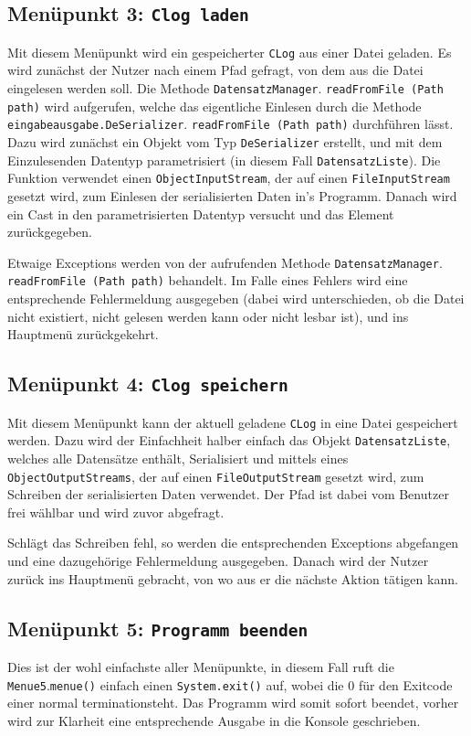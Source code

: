 \documentclass[oneside,12pt]{scrartcl}
\newcommand*{\EnableHyphenationInTexttt}{\hyphenchar\font=45\relax}%
\newcommand{\code}[1]{\textcolor{Firebrick4}{\bcode{#1}}}
\newcommand{\class}[1]{\textcolor{Green4}{\bcode{#1}}}
\newcommand{\method}[1]{\textcolor{Orange3}{\bcode{#1()}}}
\newcommand{\function}[2]{\textcolor{Orange3}{\bcode{#1 (\attribute{#2})}}}
\newcommand{\attribute}[1]{\textcolor{SkyBlue3}{\bcode{#1}}}
\newcommand{\methodcall}[2]{\class{#1}.\method{#2}}
\newcommand{\functioncall}[3]{\class{#1}. \function{#2}{#3}}
\newcommand{\bcode}[1]{\texttt{\EnableHyphenationInTexttt#1}}
\begin{document}
\subsection{Menüpunkt 3: \code{Clog laden}}
Mit diesem Menüpunkt wird ein gespeicherter \code{CLog} aus einer Datei geladen. Es wird zunächst der Nutzer nach einem Pfad gefragt, von dem aus die Datei eingelesen werden soll. Die Methode \functioncall{DatensatzManager}{readFromFile}{Path path} wird aufgerufen, welche das eigentliche Einlesen durch die Methode \functioncall{eingabeausgabe.DeSerializer}{readFromFile}{Path path} durchführen lässt. Dazu wird zunächst ein Objekt vom Typ \class{DeSerializer} erstellt, und mit dem Einzulesenden Datentyp parametrisiert (in diesem Fall \class{DatensatzListe}). Die Funktion verwendet einen \code{ObjectInputStream}, der auf einen \code{FileInputStream} gesetzt wird, zum Einlesen der serialisierten Daten in's Programm. Danach wird ein Cast in den parametrisierten Datentyp versucht und das Element zurückgegeben.

Etwaige Exceptions werden von der aufrufenden Methode \functioncall{DatensatzManager}{readFromFile}{Path path} behandelt. Im Falle eines Fehlers wird eine entsprechende Fehlermeldung ausgegeben (dabei wird unterschieden, ob die Datei nicht existiert, nicht gelesen werden kann oder nicht lesbar ist), und ins Hauptmenü zurückgekehrt.

\subsection{Menüpunkt 4: \code{Clog speichern}}
Mit diesem Menüpunkt kann der aktuell geladene \code{CLog} in eine Datei gespeichert werden. Dazu wird der Einfachheit halber einfach das Objekt \class{DatensatzListe}, welches alle Datensätze enthält, Serialisiert und mittels eines \code{ObjectOutputStreams}, der auf einen \code{FileOutputStream} gesetzt wird, zum Schreiben der serialisierten Daten verwendet. Der Pfad ist dabei vom Benutzer frei wählbar und wird zuvor abgefragt.

Schlägt das Schreiben fehl, so werden die entsprechenden Exceptions abgefangen und eine dazugehörige Fehlermeldung ausgegeben. Danach wird der Nutzer zurück ins Hauptmenü gebracht, von wo aus er die nächste Aktion tätigen kann.

\subsection{Menüpunkt 5: \code{Programm beenden}}
Dies ist der wohl einfachste aller Menüpunkte, in diesem Fall ruft die \methodcall{Menue5}{menue} einfach einen \code{System.exit(\attribute{0})} auf, wobei die 0 für den Exitcode einer \glqq normal termination\grqq steht. Das Programm wird somit sofort beendet, vorher wird zur Klarheit eine entsprechende Ausgabe in die Konsole geschrieben.
\end{document}
